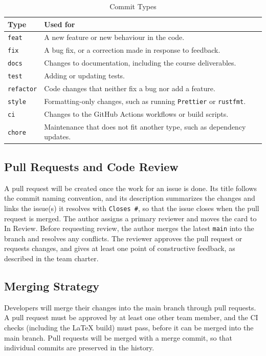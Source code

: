 \documentclass{article}
\begin{document}
\begin{table}[H]
\caption{Commit Types} \label{tab:commit-types}
\begin{tabularx}{\textwidth}{p{2.3cm}>{\raggedright\arraybackslash}X}
\toprule
\textbf{Type} & \textbf{Used for}\\
\midrule
\texttt{feat} & A new feature or new behaviour in the code.\\
\texttt{fix} & A bug fix, or a correction made in response to feedback.\\
\texttt{docs} & Changes to documentation, including the course deliverables.\\
\texttt{test} & Adding or updating tests.\\
\texttt{refactor} & Code changes that neither fix a bug nor add a feature.\\
\texttt{style} & Formatting-only changes, such as running \texttt{Prettier} or \texttt{rustfmt}.\\
\texttt{ci} & Changes to the GitHub Actions workflows or build scripts.\\
\texttt{chore} & Maintenance that does not fit another type, such as dependency updates.\\
\bottomrule
\end{tabularx}
\end{table}

\subsection{Pull Requests and Code Review}
A pull request will be created once the work for an issue is done. Its title follows the commit naming convention, and its description summarizes the changes and links the issue(s) it resolves with \texttt{Closes \#<issue-number>}, so that the issue closes when the pull request is merged. The author assigns a primary reviewer and moves the card to In Review. Before requesting review, the author merges the latest \texttt{main} into the branch and resolves any conflicts. The reviewer approves the pull request or requests changes, and gives at least one point of constructive feedback, as described in the team charter.

\subsection{Merging Strategy}
Developers will merge their changes into the main branch through pull requests.
A pull request must be approved by at least one other team member, and the CI checks (including the LaTeX build) must pass, before it can be merged into the main branch.
Pull requests will be merged with a merge commit, so that individual commits are preserved in the history.
\end{document}
